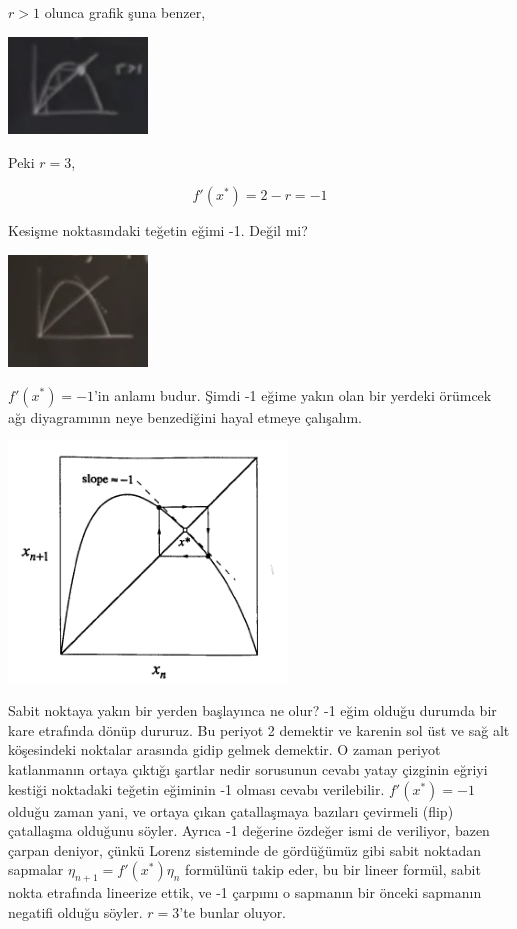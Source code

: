 \documentclass[12pt,fleqn]{article}\usepackage{../../common}
\begin{document}
$r>1$ olunca grafik şuna benzer,

\includegraphics[width=10em]{19_12.png}

Peki $r=3$,

$$ f'(x^*) = 2-r = -1 $$

Kesişme noktasındaki teğetin eğimi -1. Değil mi? 

\includegraphics[width=10em]{19_13.png}

$f'(x^*)=-1$'in anlamı budur. Şimdi -1 eğime yakın olan bir yerdeki örümcek
ağı diyagramının neye benzediğini hayal etmeye çalışalım.

\includegraphics[width=20em]{19_14.png}

Sabit noktaya yakın bir yerden başlayınca ne olur? -1 eğim olduğu durumda
bir kare etrafında dönüp dururuz. Bu periyot 2 demektir ve karenin sol üst
ve sağ alt köşesindeki noktalar arasında gidip gelmek demektir. O zaman
periyot katlanmanın ortaya çıktığı şartlar nedir sorusunun cevabı yatay
çizginin eğriyi kestiği noktadaki teğetin eğiminin -1 olması cevabı
verilebilir. $f'(x^*)=-1$ olduğu zaman yani, ve ortaya çıkan çatallaşmaya
bazıları çevirmeli (flip) çatallaşma olduğunu söyler. Ayrıca -1 değerine
özdeğer ismi de veriliyor, bazen çarpan deniyor, çünkü Lorenz sisteminde de
gördüğümüz gibi sabit noktadan sapmalar $\eta_{n+1} = f'(x^*)\eta_n$
formülünü takip eder, bu bir lineer formül, sabit nokta etrafında lineerize
ettik, ve -1 çarpımı o sapmanın bir önceki sapmanın negatifi olduğu
söyler. $r=3$'te bunlar oluyor.
\end{document}
